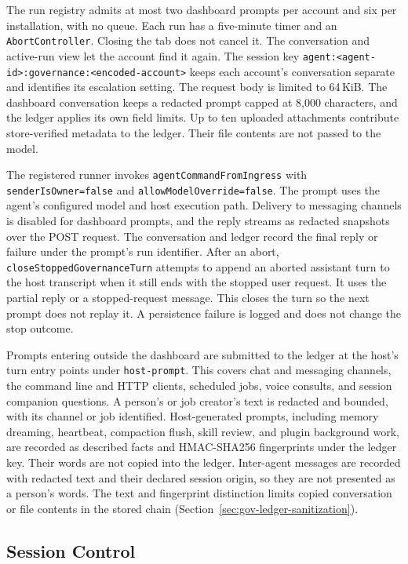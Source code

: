 {\color{red}The run registry admits at most two dashboard prompts per account and six
per installation, with no queue. Each run has a five-minute timer and an
\texttt{AbortController}. Closing the tab does not cancel it. The conversation
and active-run view let the account find it again. The session key
\texttt{agent:<agent-id>:governance:<encoded-account>} keeps each account's
conversation separate and identifies its escalation setting. The request body
is limited to 64\,KiB. The dashboard conversation keeps a redacted prompt capped
at 8,000 characters, and the ledger applies its own field limits. Up to ten
uploaded attachments contribute store-verified metadata to the ledger. Their
file contents are not passed to the model.

The registered runner invokes \texttt{agentCommandFromIngress} with
\texttt{senderIsOwner=false} and \texttt{allowModelOverride=false}. The prompt
uses the agent's configured model and host execution path. Delivery to messaging
channels is disabled for dashboard prompts, and the reply streams as redacted
snapshots over the POST request. The conversation and ledger record the final
reply or failure under the prompt's run identifier. After an abort,
\texttt{closeStoppedGovernanceTurn} attempts to append an aborted assistant
turn to the host transcript when it still ends with the stopped user request.
It uses the partial reply or a stopped-request message. This closes the turn
so the next prompt does not replay it. A persistence failure is logged and does
not change the stop outcome.

Prompts entering outside the dashboard are submitted to the ledger at the
host's turn entry points under \texttt{host-prompt}. This covers chat and
messaging channels, the command line and HTTP clients, scheduled jobs, voice
consults, and session companion questions. A person's or job creator's text is
redacted and bounded, with its channel or job identified. Host-generated
prompts, including memory dreaming, heartbeat, compaction flush, skill review,
and plugin background work, are recorded as described facts and
HMAC-SHA256 fingerprints under the ledger key. Their words are not copied into
the ledger. Inter-agent messages are recorded with redacted text and their declared session origin, so they are
not presented as a person's words. The text and fingerprint distinction limits
copied conversation or file contents in the stored chain
(Section~\ref{sec:gov-ledger-sanitization}).}

\FloatBarrier
\subsection{Session Control}
\label{sec:gov-killswitch}

